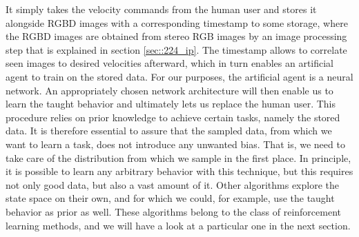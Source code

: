 It simply takes the velocity commands from the human user and stores it alongside RGBD images with a corresponding timestamp to some storage, where the RGBD images are obtained from stereo RGB images by an image processing step that is explained in section \ref{sec::224_ip}. The timestamp allows to correlate seen images to desired velocities afterward, which in turn enables an artificial agent to train on the stored data. For our purposes, the artificial agent is a neural network. An appropriately chosen network architecture will then enable us to learn the taught behavior and ultimately lets us replace the human user. This procedure relies on prior knowledge to achieve certain tasks, namely the stored data. It is therefore essential to assure that the sampled data, from which we want to learn a task, does not introduce any unwanted bias. That is, we need to take care of the distribution from which we sample in the first place. In principle, it is possible to learn any arbitrary behavior with this technique, but this requires not only good data, but also a vast amount of it. Other algorithms explore the state space on their own, and for which we could, for example, use the taught behavior as prior as well. These algorithms belong to the class of reinforcement learning methods, and we will have a look at a particular one in the next section.